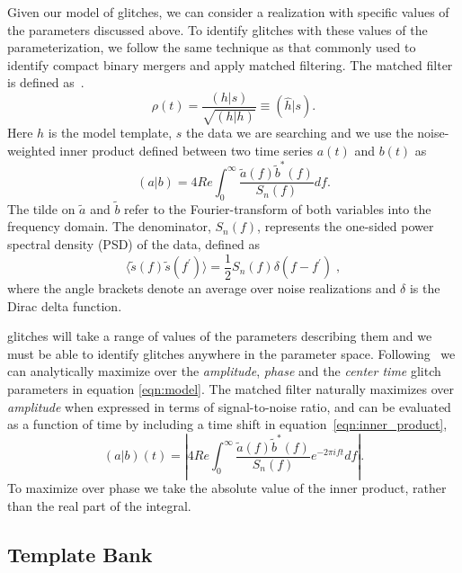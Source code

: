 Given our model of \scl{} glitches, we can consider a realization with specific values of the parameters discussed above. To identify glitches with these values of the parameterization, we follow the same technique as that commonly used to identify compact binary mergers and apply matched filtering. The matched filter is defined as~\cite{findchirp}. 
%
\begin{equation}
  \rho(t) = \frac{(h | s)}{\sqrt{(h | h)}} \equiv (\hat{h} | s).
  \label{eqn:mf_1}
\end{equation}
%
Here $h$ is the model template, $s$ the \gw{} data we are searching and we use the noise-weighted inner product defined between two time series $a(t)$ and $b(t)$ as
%
\begin{equation}
  (a | b) = 4 Re \int^{\infty}_{0} \frac{\tilde{a}(f) \tilde{b}^*(f)}{S_n(f)} 
  df.
  \label{eqn:inner_product}
\end{equation}
%
The tilde on $\tilde{a}$ and $\tilde{b}$ refer to the Fourier-transform of both variables into the frequency domain. The denominator, $S_n(f)$, represents the one-sided power spectral density (PSD) of the data, defined as
%
\begin{equation}
  \langle \tilde{s}(f) \tilde{s}(f^\prime) \rangle = \frac{1}{2} S_n(f) \delta(f - f^\prime) \;,
  \label{eqn:psd}
\end{equation}
%
where the angle brackets denote an average over noise realizations and $\delta$ is the Dirac delta function.

\Scl{} glitches will take a range of values of the parameters describing them and we must be able to identify glitches anywhere in the parameter space. Following~\cite{findchirp} we can analytically maximize over the \emph{amplitude}, \emph{phase} and the \emph{center time} glitch parameters in equation \ref{eqn:model}. The matched filter naturally maximizes over \emph{amplitude} when expressed in terms of signal-to-noise ratio, and can be evaluated as a function of time by including a time shift in equation~\ref{eqn:inner_product},
%
\begin{equation}
  (a | b)(t) = \left| 4 Re \int^{\infty}_{0} \frac{\tilde{a}(f) \tilde{b}^*(f)}{S_n(f)} 
  e^{-2 \pi i f t} 
  df \right|.
  \label{eqn:inner_product_time}
\end{equation}
%
To maximize over phase we take the absolute value of the inner product, rather than the real part of the integral.

\subsection{Template Bank}


